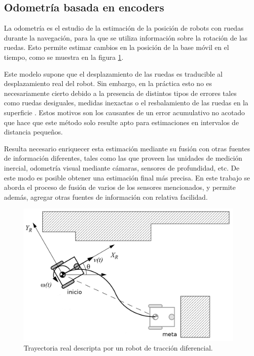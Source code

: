 \subsection{Odometría basada en encoders}

La odometría es el estudio de la estimación de la posición de robots con ruedas durante la navegación, para la que se utiliza información sobre la rotación de las ruedas. Esto permite estimar cambios en la posición de la base móvil en el tiempo, como se muestra en la figura \ref{fig:navigation}.

Este modelo supone que el desplazamiento de las ruedas es traducible al desplazamiento real del robot. Sin embargo, en la práctica esto no es necesariamente cierto debido a la presencia de distintos tipos de errores tales como ruedas desiguales, medidas inexactas o el resbalamiento de las ruedas en la superficie \citep{PAPER:2}. Estos motivos son los causantes de un error acumulativo no acotado que hace que este método solo resulte apto para estimaciones en intervalos de distancia pequeños.

Resulta necesario enriquecer esta estimación mediante su fusión con otras fuentes de información diferentes, tales como las que proveen las unidades de medición inercial, odometría visual mediante cámaras, sensores de profundidad, etc. De este modo es posible obtener una estimación final más precisa. En este trabajo se aborda el proceso de fusión de varios de los sensores mencionados, y permite además, agregar otras fuentes de información con relativa facilidad.

\begin{figure}[ht]
    \centering
    \includegraphics[scale=0.8]{./Figures/navigation.png}
    \caption{Trayectoria real descripta por un robot de tracción diferencial.}
    \label{fig:navigation}
\end{figure}

